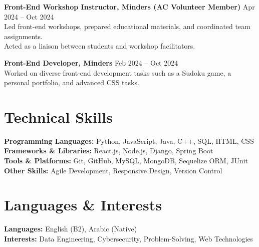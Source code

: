 \documentclass[a4paper,10pt]{article}
\begin{document}
\textbf{Front-End Workshop Instructor, Minders (AC Volunteer Member)} \hfill Apr 2024 -- Oct 2024 \\
\textbullet{}\hspace{2mm} Led front-end workshops, prepared educational materials, and coordinated team assignments.  \\
\textbullet{}\hspace{2mm} Acted as a liaison between students and workshop facilitators.

\textbf{Front-End Developer, Minders} \hfill Feb 2024 -- Oct 2024 \\
\textbullet{}\hspace{2mm} Worked on diverse front-end development tasks such as a Sudoku game, a personal portfolio, and advanced CSS tasks.


\section*{Technical Skills}
\textbf{Programming Languages:} Python, JavaScript, Java, C++, SQL, HTML, CSS \\
\textbf{Frameworks \& Libraries:} React.js, Node.js, Django, Spring Boot \\
\textbf{Tools \& Platforms:} Git, GitHub, MySQL, MongoDB, Sequelize ORM, JUnit \\
\textbf{Other Skills:} Agile Development, Responsive Design, Version Control

\section*{Languages \& Interests}
\textbf{Languages:} English (B2), Arabic (Native) \\
\textbf{Interests:} Data Engineering, Cybersecurity, Problem-Solving, Web Technologies
\end{document}
